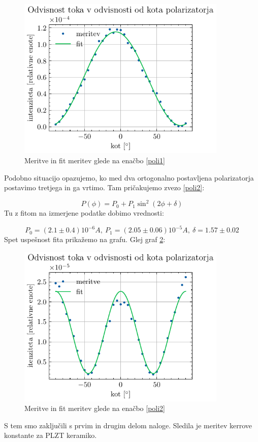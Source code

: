 \documentclass[12pt]{article}
\begin{document}
\begin{figure}[ht]
\begin{center}
    \includegraphics[width=10cm]{poli1.pdf}
    \caption{Meritve in fit meritev glede na enačbo \ref{poli1}}
    \label{1poli}
\end{center}
\end{figure}

Podobno situacijo opazujemo, ko med dva ortogonalno postavljena polarizatorja postavimo tretjega in ga vrtimo. Tam pričakujemo zvezo \ref{poli2}:

\begin{equation}
    P(\phi) = P_0 + P_1 \sin ^2 \left(2\phi + \delta\right)
    \label{poli2}
\end{equation}
Tu z fitom na izmerjene podatke dobimo vrednosti:

\begin{equation*}
    P_0 = (2.1 \pm 0.4) 10^{-6} A,\ P_1 = (2.05\pm 0.06) 10^{-5} A, \ \delta = 1.57 \pm 0.02
\end{equation*}
Spet uspešnost fita prikažemo na grafu. Glej graf \ref{2poli}:

\begin{figure}[ht]
\begin{center}
    \includegraphics[width=10cm]{poli2.pdf}
    \caption{Meritve in fit meritev glede na enačbo \ref{poli2}}
    \label{2poli}
\end{center}
\end{figure}

S tem smo zaključili s prvim in drugim delom naloge. Sledila je meritev kerrove konstante za PLZT keramiko.
\end{document}
